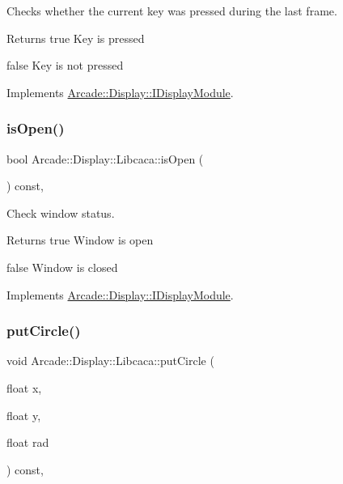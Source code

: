 Checks whether the current key was pressed during the last frame. 

\begin{DoxyReturn}{Returns}
true Key is pressed 

false Key is not pressed 
\end{DoxyReturn}


Implements \mbox{\hyperlink{classArcade_1_1Display_1_1IDisplayModule_ac347fc77c01e12c5ce23be99d357008d}{Arcade\+::\+Display\+::\+I\+Display\+Module}}.

\mbox{\label{classArcade_1_1Display_1_1Libcaca_aae9aa5b1c54a2086c4fa92e7710fc845}} 
\subsubsection{\texorpdfstring{isOpen()}{isOpen()}}
{\footnotesize\ttfamily bool Arcade\+::\+Display\+::\+Libcaca\+::is\+Open (\begin{DoxyParamCaption}{ }\end{DoxyParamCaption}) const\hspace{0.3cm}{\ttfamily [final]}, {\ttfamily [virtual]}}



Check window status. 

\begin{DoxyReturn}{Returns}
true Window is open 

false Window is closed 
\end{DoxyReturn}


Implements \mbox{\hyperlink{classArcade_1_1Display_1_1IDisplayModule_a34c86dd2e7aa60a70c0cc06ccbd34e47}{Arcade\+::\+Display\+::\+I\+Display\+Module}}.

\mbox{\label{classArcade_1_1Display_1_1Libcaca_a1a718ada53339b195c532fa52600e164}} 
\subsubsection{\texorpdfstring{putCircle()}{putCircle()}}
{\footnotesize\ttfamily void Arcade\+::\+Display\+::\+Libcaca\+::put\+Circle (\begin{DoxyParamCaption}\item[{float}]{x,  }\item[{float}]{y,  }\item[{float}]{rad }\end{DoxyParamCaption}) const\hspace{0.3cm}{\ttfamily [final]}, {\ttfamily [virtual]}}



